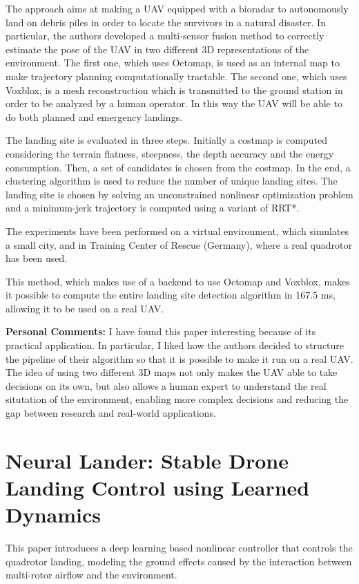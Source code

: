 \documentclass[a4paper]{article}
\begin{document}
The approach aims at making a UAV equipped with a bioradar to autonomously
land on debris piles in order to locate the survivors in a natural
disaster. In particular, the authors developed a multi-sensor fusion method to
correctly estimate the pose of the UAV in two different 3D representations
of the environment. The first one, which uses Octomap, is used as an internal
map to make trajectory planning computationally tractable. The second one,
which uses Voxblox, is a mesh reconstruction which is transmitted to
the ground station in order to be analyzed by a human operator. In this way
the UAV will be able to do both planned and emergency landings.

The landing site is evaluated in three steps. Initially a costmap is computed
considering the terrain flatness, steepness, the depth accuracy and the
energy consumption. Then, a set of candidates is chosen from the costmap. In the
end, a clustering algorithm is used to reduce the number of unique landing sites.
The landing site is chosen by solving an unconstrained nonlinear optimization
problem and a minimum-jerk trajectory is computed using a variant of RRT*.

The experiments have been performed on a virtual environment, which simulates
a small city, and in Training Center of Rescue (Germany), where a real quadrotor
has been used.

This method, which makes use of a backend to use Octomap and Voxblox, makes it
possible to compute the entire landing site detection algorithm in 167.5 ms,
allowing it to be used on a real UAV.

\textbf{Personal Comments:} I have found this paper interesting because of
its practical application. In particular, I liked how the authors
decided to structure the pipeline of their algorithm so that it is possible
to make it run on a real UAV. The idea of using two different 3D maps
not only makes the UAV able to take decisions on its own, but also allows a
human expert to understand the real situtation of the environment, enabling
more complex decisions and reducing the gap between research and real-world
applications.

\section{Neural Lander: Stable Drone Landing Control using Learned Dynamics}
This paper \cite{DBLP:journals/corr/abs-1811-08027} introduces a deep learning
based nonlinear controller that controls the quadrotor landing, modeling
the ground effects caused by the interaction between multi-rotor airflow and
the environment.
\end{document}
